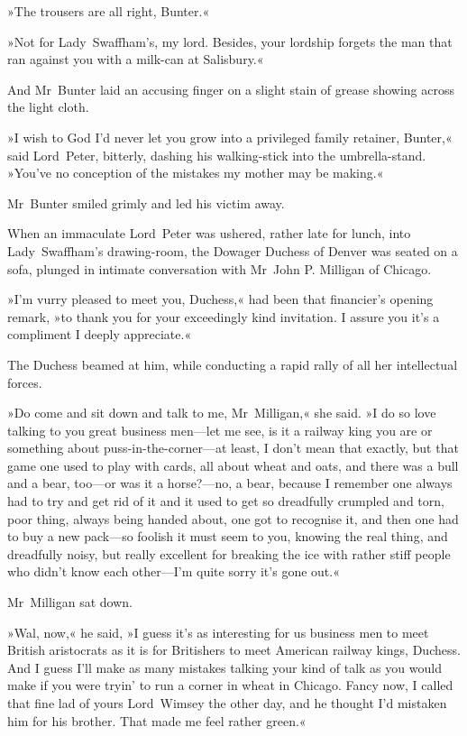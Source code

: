 »The trousers are all right, Bunter.«

»Not for Lady~Swaffham's, my lord. Besides, your lordship forgets the man that ran against you with a milk-can at Salisbury.«

And Mr~Bunter laid an accusing finger on a slight stain of grease showing across the light cloth.

»I wish to God I'd never let you grow into a privileged family retainer, Bunter,« said Lord~Peter, bitterly, dashing his walking-stick into the umbrella-stand. »You've no conception of the mistakes my mother may be making.«

Mr~Bunter smiled grimly and led his victim away.

When an immaculate Lord~Peter was ushered, rather late for lunch, into Lady~Swaffham's drawing-room, the Dowager Duchess of Denver was seated on a sofa, plunged in intimate conversation with Mr~John P\@. Milligan of Chicago.

»I'm vurry pleased to meet you, Duchess,« had been that financier's opening remark, »to thank you for your exceedingly kind invitation. I assure you it's a compliment I deeply appreciate.«

The Duchess beamed at him, while conducting a rapid rally of all her intellectual forces.

»Do come and sit down and talk to me, Mr~Milligan,« she said. »I do so love talking to you great business men—let me see, is it a railway king you are or something about puss-in-the-corner—at least, I don't mean that exactly, but that game one used to play with cards, all about wheat and oats, and there was a bull and a bear, too—or was it a horse?---no, a bear, because I remember one always had to try and get rid of it and it used to get so dreadfully crumpled and torn, poor thing, always being handed about, one got to recognise it, and then one had to buy a new pack—so foolish it must seem to you, knowing the real thing, and dreadfully noisy, but really excellent for breaking the ice with rather stiff people who didn't know each other—I'm quite sorry it's gone out.«

Mr~Milligan sat down.

»Wal, now,« he said, »I guess it's as interesting for us business men to meet British aristocrats as it is for Britishers to meet American railway kings, Duchess. And I guess I'll make as many mistakes talking your kind of talk as you would make if you were tryin' to run a corner in wheat in Chicago. Fancy now, I called that fine lad of yours Lord~Wimsey the other day, and he thought I'd mistaken him for his brother. That made me feel rather green.«

